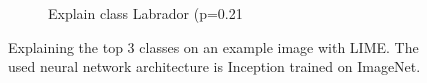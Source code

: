 \begin{figure}[H]
\begin{subfigure}[t]{.23\textwidth}
        \caption{Explain class Labrador (p=0.21}
    \end{subfigure}
    \caption{Explaining the top 3 classes on an example image with LIME. The used neural network architecture is Inception trained on ImageNet.\cite{ribeiro2016should}}
    \label{lime_dog}
\end{figure}
